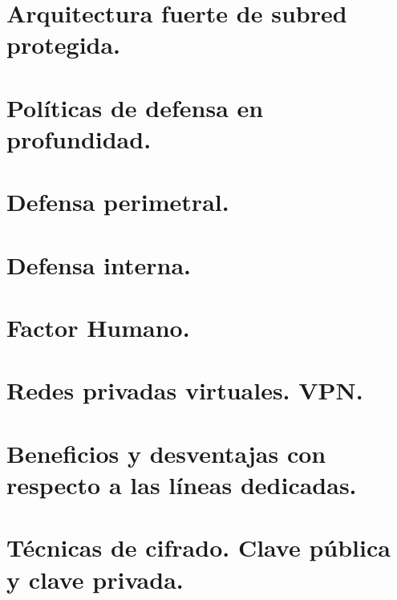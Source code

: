 \documentclass[letterpaper,10pt,spanish]{sphinxmanual}
\begin{document}
\section{Arquitectura fuerte de subred protegida.}
\label{\detokenize{tema_acceso_remoto/tema_acceso_remoto:arquitectura-fuerte-de-subred-protegida}}

\section{Políticas de defensa en profundidad.}
\label{\detokenize{tema_acceso_remoto/tema_acceso_remoto:politicas-de-defensa-en-profundidad}}

\section{Defensa perimetral.}
\label{\detokenize{tema_acceso_remoto/tema_acceso_remoto:defensa-perimetral}}

\section{Defensa interna.}
\label{\detokenize{tema_acceso_remoto/tema_acceso_remoto:defensa-interna}}

\section{Factor Humano.}
\label{\detokenize{tema_acceso_remoto/tema_acceso_remoto:factor-humano}}

\section{Redes privadas virtuales. VPN.}
\label{\detokenize{tema_acceso_remoto/tema_acceso_remoto:redes-privadas-virtuales-vpn}}

\section{Beneficios y desventajas con respecto a las líneas dedicadas.}
\label{\detokenize{tema_acceso_remoto/tema_acceso_remoto:beneficios-y-desventajas-con-respecto-a-las-lineas-dedicadas}}

\section{Técnicas de cifrado. Clave pública y clave privada.}
\label{\detokenize{tema_acceso_remoto/tema_acceso_remoto:tecnicas-de-cifrado-clave-publica-y-clave-privada}}
\end{document}
